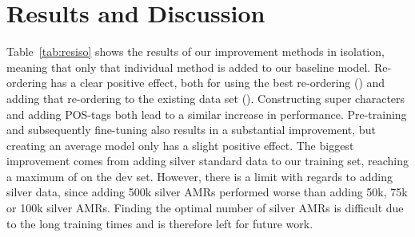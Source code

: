 \documentclass[a4paper,10pt,twoside]{article}
\begin{document}
\section{Results and Discussion} 

Table~\ref{tab:resiso} shows the results of our improvement methods in isolation, meaning that only that individual method is added to our baseline model. Re-ordering has a clear positive effect, both for using the best re-ordering () and adding that re-ordering to the existing data set (). Constructing super characters and adding POS-tags both lead to a similar increase in performance. Pre-training and subsequently fine-tuning also results in a substantial improvement, but creating an average model only has a slight positive effect. The biggest improvement comes from adding silver standard data to our training set, reaching a maximum of  on the dev set. However, there is a limit with regards to adding silver data, since adding 500k silver AMRs performed worse than adding 50k, 75k or 100k silver AMRs. Finding the optimal number of silver AMRs is difficult due to the long training times and is therefore left for future work.
\end{document}

